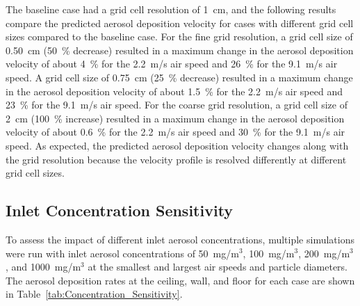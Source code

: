 The baseline case had a grid cell resolution of 1~cm, and the following results compare the predicted aerosol deposition velocity for cases with different grid cell sizes compared to the baseline case. For the fine grid resolution, a grid cell size of 0.50~cm (50~\% decrease) resulted in a maximum change in the aerosol deposition velocity of about 4~\% for the 2.2~m/s air speed and 26~\% for the 9.1~m/s air speed. A grid cell size of 0.75~cm (25~\% decrease) resulted in a maximum change in the aerosol deposition velocity of about 1.5~\% for the 2.2~m/s air speed and 23~\% for the 9.1~m/s air speed. For the coarse grid resolution, a grid cell size of 2~cm (100~\% increase) resulted in a maximum change in the aerosol deposition velocity of about 0.6~\% for the 2.2~m/s air speed and 30~\% for the 9.1~m/s air speed. As expected, the predicted aerosol deposition velocity changes along with the grid resolution because the velocity profile is resolved differently at different grid cell sizes.

\subsection{Inlet Concentration Sensitivity}
\label{sec:Concentration_Sensitivity}

To assess the impact of different inlet aerosol concentrations, multiple simulations were run with inlet aerosol concentrations of 50~mg/m$^3$, 100~mg/m$^3$, 200~mg/m$^3$, and 1000~mg/m$^3$ at the smallest and largest air speeds and particle diameters. The aerosol deposition rates at the ceiling, wall, and floor for each case are shown in Table~\ref{tab:Concentration_Sensitivity}.

